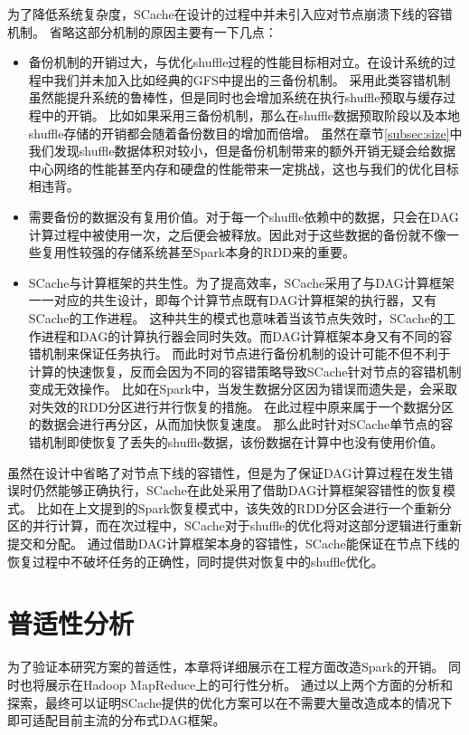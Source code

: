 为了降低系统复杂度，SCache在设计的过程中并未引入应对节点崩溃下线的容错机制。
省略这部分机制的原因主要有一下几点：
\begin{itemize}
    \item 备份机制的开销过大，与优化shuffle过程的性能目标相对立。在设计系统的过程中我们并未加入比如经典的GFS\cite{gfs}中提出的三备份机制。
    采用此类容错机制虽然能提升系统的鲁棒性，但是同时也会增加系统在执行shuffle预取与缓存过程中的开销。
    比如如果采用三备份机制，那么在shuffle数据预取阶段以及本地shuffle存储的开销都会随着备份数目的增加而倍增。
    虽然在章节\ref{subsec:size}中我们发现shuffle数据体积对较小，但是备份机制带来的额外开销无疑会给数据中心网络的性能甚至内存和硬盘的性能带来一定挑战，这也与我们的优化目标相违背。
    \item 需要备份的数据没有复用价值。对于每一个shuffle依赖中的数据，只会在DAG计算过程中被使用一次，之后便会被释放。因此对于这些数据的备份就不像一些复用性较强的存储系统甚至Spark本身的RDD来的重要。
    \item SCache与计算框架的共生性。为了提高效率，SCache采用了与DAG计算框架一一对应的共生设计，即每个计算节点既有DAG计算框架的执行器，又有SCache的工作进程。
    这种共生的模式也意味着当该节点失效时，SCache的工作进程和DAG的计算执行器会同时失效。而DAG计算框架本身又有不同的容错机制来保证任务执行。
    而此时对节点进行备份机制的设计可能不但不利于计算的快速恢复，反而会因为不同的容错策略导致SCache针对节点的容错机制变成无效操作。
    比如在Spark中，当发生数据分区因为错误而遗失是，会采取对失效的RDD分区进行并行恢复的措施。
    在此过程中原来属于一个数据分区的数据会进行再分区，从而加快恢复速度。
    那么此时针对SCache单节点的容错机制即使恢复了丢失的shuffle数据，该份数据在计算中也没有使用价值。
\end{itemize}

虽然在设计中省略了对节点下线的容错性，但是为了保证DAG计算过程在发生错误时仍然能够正确执行，SCache在此处采用了借助DAG计算框架容错性的恢复模式。
比如在上文提到的Spark恢复模式中，该失效的RDD分区会进行一个重新分区的并行计算，而在次过程中，SCache对于shuffle的优化将对这部分逻辑进行重新提交和分配。
通过借助DAG计算框架本身的容错性，SCache能保证在节点下线的恢复过程中不破坏任务的正确性，同时提供对恢复中的shuffle优化。

\section{普适性分析}
\label{sec:impl}

为了验证本研究方案的普适性，本章将详细展示在工程方面改造Spark的开销。
同时也将展示在Hadoop MapReduce上的可行性分析。
通过以上两个方面的分析和探索，最终可以证明SCache提供的优化方案可以在不需要大量改造成本的情况下即可适配目前主流的分布式DAG框架。

